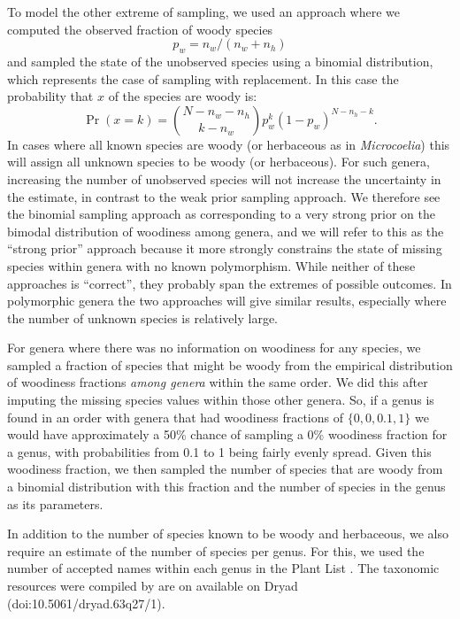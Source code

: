 \documentclass[a4paper,12pt]{article}
\begin{document}
To model the other extreme of sampling, we used an approach where we
computed the observed fraction of woody species 
\[p_w = n_w / (n_w +n_h)\] 
and sampled the state of the unobserved species using a
binomial distribution, which represents the case of sampling
with replacement. In this case the probability that $x$ of the species
are woody is:
\begin{equation}
  \Pr(x = k) = {N - n_w - n_h \choose k - n_w} 
  p_w^k (1-p_w)^{N - n_h - k}.
\end{equation}
%
In cases where all known species are woody (or herbaceous as in
\textit{Microcoelia}) this will assign all unknown species to be woody
(or herbaceous). For such genera, increasing the number of unobserved
species will not increase the uncertainty in the estimate, in contrast
to the weak prior sampling approach.
%
We therefore see the binomial sampling approach as corresponding to a
very strong prior on the bimodal distribution of woodiness among
genera, and we will refer to this as the ``strong prior'' approach
because it more strongly constrains the state of missing species
within genera with no known polymorphism.  While neither of these
approaches is ``correct'', they probably span the extremes of possible
outcomes.
%
In polymorphic genera the two approaches will give similar results,
especially where the number of unknown species is relatively large.

For genera where there was no information on woodiness for any
species, we sampled a fraction of species that might be woody from
the empirical distribution of woodiness fractions \textit{among
  genera} within the same order. We did this after imputing the
missing species values within those other genera. So, if a genus is
found in an order with genera that had woodiness fractions of $\{0, 0,
0.1, 1\}$ we would have approximately a 50\% chance of sampling a 0\%
woodiness fraction for a genus, with probabilities from 0.1 to 1 being
fairly evenly spread.  Given this woodiness fraction, we then sampled
the number of species that are woody from a binomial distribution with
this fraction and the number of species in the genus as its
parameters.

In addition to the number of species known to be woody and herbaceous,
we also require an estimate of the number of species per genus.  For this, we
used the number of accepted names within each genus in the Plant List
\citep{ThePlantList}. The taxonomic resources were compiled by \citet{Zanne}
are on available on Dryad (doi:10.5061/dryad.63q27/1). 
\end{document}
